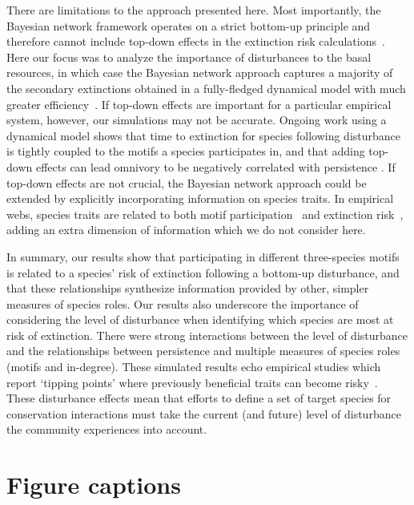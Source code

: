 \documentclass[12pt]{article}
\begin{document}
\begin{spacing}{2.0}
    
    There are limitations to the approach presented here.
    Most importantly, the Bayesian network framework operates on a  strict bottom-up principle and therefore cannot include top-down effects in the extinction risk calculations~\citep{Eklof2013}. 
    Here our focus was to analyze the importance of disturbances to the basal resources, in which case the Bayesian network approach captures a majority of the secondary extinctions obtained in a fully-fledged dynamical model with much greater efficiency~\citep{Eklof2013}.
    If top-down effects are important for a particular empirical system, however, our simulations may not be accurate. 
    Ongoing work using a dynamical model shows that time to extinction for species following disturbance is tightly coupled to the motifs a species participates in, and that adding top-down effects can lead omnivory to be negatively correlated with persistence \citep{Cirtwill2021_inprep}. 
    If top-down effects are not crucial, the Bayesian network approach could be extended by explicitly incorporating information on species traits.
    In empirical webs, species traits are related to both motif participation~\citep{cirtwill2018feeding} and extinction risk~\citep{Brose2017, curtsdotter2011robustness, Cardillo2005, Purvis2000},
    adding an extra dimension of information which we do not consider here.
    
    In summary, our results show that participating in different three-species motifs is related to a species' risk of extinction following a bottom-up disturbance, and that these relationships synthesize information provided by other, simpler measures of species roles.
    Our results also underscore the importance of considering the level of disturbance when identifying which species are most at risk of extinction.
    There were strong interactions between the level of disturbance and the relationships between persistence and multiple measures of species roles (motifs and in-degree).
    These simulated results echo empirical studies which report `tipping points' where previously beneficial traits can become risky~\citep{}.
    These disturbance effects mean that efforts to define a set of target species for conservation interactions must take the current (and future) level of disturbance the community experiences into account.
    

\clearpage    

\section*{Figure captions}


\end{spacing}
\end{document}
